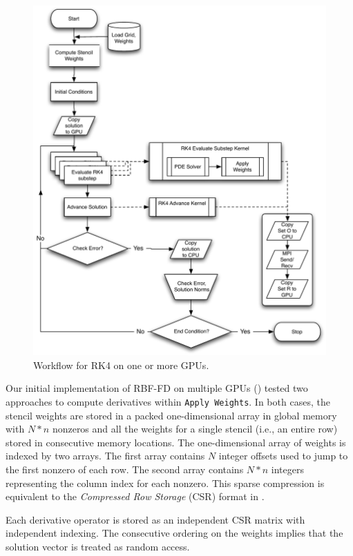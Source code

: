 \documentclass{report}
\begin{document}
\begin{figure}[ht]
      \centering
       \includegraphics[width=5in]{../figures/paper1/figures/omnigraffle/RK4_multi_GPU_flow.pdf}
      \caption{Workflow for RK4 on one or more GPUs. }
      \label{fig:multi_GPU_flow}
\end{figure}
 
Our initial implementation of RBF-FD on multiple GPUs (\cite{BolligFlyerErlebacher2012}) tested two approaches to compute derivatives within \texttt{Apply Weights}. 
In both cases, the stencil weights are stored in  
a packed one-dimensional array in global memory with $N*n$ nonzeros and all the weights 
for a single stencil (i.e., an entire row) stored in consecutive memory locations. The one-dimensional array of weights is indexed by two arrays. The first array contains $N$ integer offsets used to jump to the first nonzero of each row. The second array contains $N*n$ integers representing the column index for each nonzero. This sparse compression is equivalent to the \emph{Compressed Row Storage} (CSR) format in \cite{Bell2009, Rupp2010, Cusp2012}.

Each derivative operator is stored as an independent CSR matrix with independent indexing. The consecutive ordering on the weights implies that the solution vector is treated as random access.  %
\end{document}
